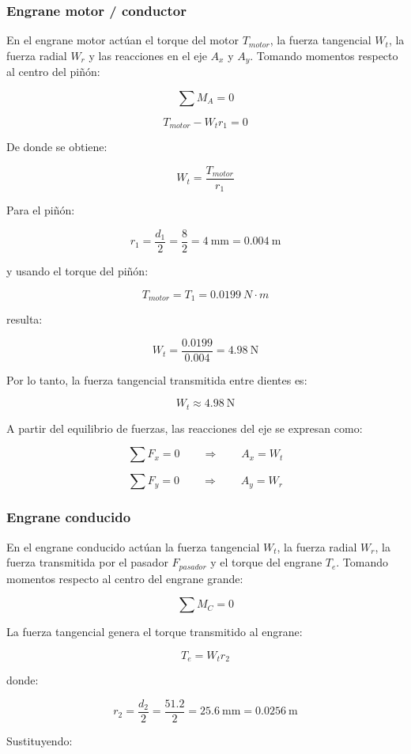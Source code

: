 \documentclass[12pt,letterpaper]{article}
\begin{document}
\subsubsection*{Engrane motor / conductor}

En el engrane motor actúan el torque del motor \(T_{motor}\), la fuerza tangencial \(W_t\), la fuerza radial \(W_r\) y las reacciones en el eje \(A_x\) y \(A_y\). Tomando momentos respecto al centro del piñón:

\[
\sum M_A = 0
\]

\[
T_{motor} - W_t r_1 = 0
\]

De donde se obtiene:

\[
W_t=\frac{T_{motor}}{r_1}
\]

Para el piñón:

\[
r_1=\frac{d_1}{2}=\frac{8}{2}=4 \ \text{mm}=0.004 \ \text{m}
\]

y usando el torque del piñón:

\[
T_{motor}=T_1=0.0199 \ N\cdot m
\]

resulta:

\[
W_t=\frac{0.0199}{0.004}=4.98 \ \text{N}
\]

Por lo tanto, la fuerza tangencial transmitida entre dientes es:

\[
W_t \approx 4.98 \ \text{N}
\]

A partir del equilibrio de fuerzas, las reacciones del eje se expresan como:

\[
\sum F_x = 0 \qquad \Rightarrow \qquad A_x = W_t
\]

\[
\sum F_y = 0 \qquad \Rightarrow \qquad A_y = W_r
\]

\subsubsection*{Engrane conducido}

En el engrane conducido actúan la fuerza tangencial \(W_t\), la fuerza radial \(W_r\), la fuerza transmitida por el pasador \(F_{pasador}\) y el torque del engrane \(T_e\). Tomando momentos respecto al centro del engrane grande:

\[
\sum M_C = 0
\]

La fuerza tangencial genera el torque transmitido al engrane:

\[
T_e = W_t r_2
\]

donde:

\[
r_2=\frac{d_2}{2}=\frac{51.2}{2}=25.6 \ \text{mm}=0.0256 \ \text{m}
\]

Sustituyendo:
\end{document}
